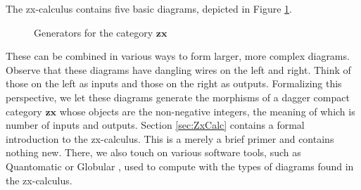 \documentclass[11pt]{amsart}
\theoremstyle{definition}
\begin{document}
The zx-calculus contains five basic diagrams, depicted in Figure \ref{fig:ZX generators}.
\begin{figure}
	\caption{Generators for the category $\mathbf{zx}$}
	\label{fig:ZX generators}
\end{figure}
These can be combined in various ways to form larger, more complex diagrams.   Observe that these diagrams have dangling wires on the left and right. Think of those on the left as inputs and those on the right as outputs.  Formalizing this perspective, we let these diagrams generate the morphisms of a dagger compact category $\mathbf{zx}$ whose objects are the non-negative integers, the meaning of which is number of inputs and outputs.  Section \ref{sec:ZxCalc} contains a formal introduction to the zx-calculus.  This is a merely a brief primer and contains nothing new.  There, we also touch on various software tools, such as Quantomatic \cite{BarKissingerVicary_Globular,DixonDuncanKissinger_QuantomaticWebsite} or Globular \cite{BarKissingerVicary_Globular}, used to compute with the types of diagrams found in the zx-calculus.  
\end{document}
